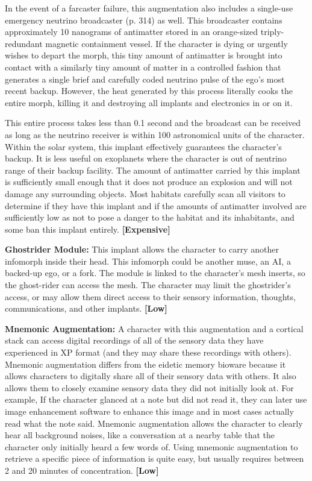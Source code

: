 In the event of a farcaster failure, this augmentation also includes a single-use emergency neutrino broadcaster (p. 314) as well. This broadcaster contains approximately 10 nanograms of antimatter stored in an orange-sized triply-redundant magnetic containment vessel. If the character is dying or urgently wishes to depart the morph, this tiny amount of antimatter is brought into contact with a similarly tiny amount of matter in a controlled fashion that generates a single brief and carefully coded neutrino pulse of the ego’s most recent backup. However, the heat generated by this process literally cooks the entire morph, killing it and destroying all implants and electronics in or on it.

This entire process takes less than 0.1 second and the broadcast can be received as long as the neutrino receiver is within 100 astronomical units of the character. Within the solar system, this implant effectively guarantees the character’s backup. It is less useful on exoplanets where the character is out of neutrino range of their backup facility. The amount of antimatter carried by this implant is sufficiently small enough that it does not produce an explosion and will not damage any surrounding objects. Most habitats carefully scan all visitors to determine if they have this implant and if the amounts of antimatter involved are sufficiently low as not to pose a danger to the habitat and its inhabitants, and some ban this implant entirely. \textbf{[Expensive]}

\textbf{Ghostrider Module:} This implant allows the character to carry another infomorph inside their head. This infomorph could be another muse, an AI, a backed-up ego, or a fork. The module is linked to the character’s mesh inserts, so the ghost-rider can access the mesh. The character may limit the ghostrider’s access, or may allow them direct access to their sensory information, thoughts, communications, and other implants. \textbf{[Low]}

\textbf{Mnemonic Augmentation:} A character with this augmentation and a cortical stack can access digital recordings of all of the sensory data they have experienced in XP format (and they may share these recordings with others). Mnemonic augmentation differs from the eidetic memory bioware because it allows characters to digitally share all of their sensory data with others. It also allows them to closely examine sensory data they did not initially look at. For example, If the character glanced at a note but did not read it, they can later use image enhancement software to enhance this image and in most cases actually read what the note said. Mnemonic augmentation allows the character to clearly hear all background noises, like a conversation at a nearby table that the character only initially heard a few words of. Using mnemonic augmentation to retrieve a specific piece of information is quite easy, but usually requires between 2 and 20 minutes of concentration. \textbf{[Low]}

